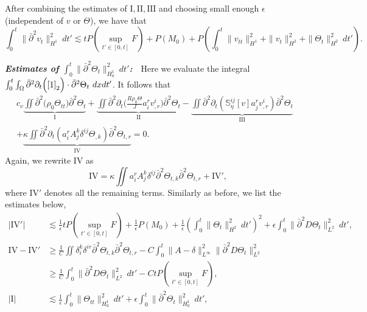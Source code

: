 \documentclass[12pt,a4paper]{amsart}
\numberwithin{equation}{section}
\theoremstyle{plain}
\theoremstyle{definition}
\newcommand{\bpartial}{\bar{\partial}}
\begin{document}
After combining the estimates of $\mathrm{I}, \mathrm{II}, \mathrm{III}$ and choosing small enough $\epsilon$ (independent of $v$ or $\Theta$), we have that
\begin{equation}\label{vtxx}
\int_{0}^{t}\|\bpartial^2 v_t\|_{H^1}^2\ dt'
\lesssim tP(\sup\limits_{t'\in[0,t]}F)+P(M_0)+P\left(  \int_{0}^{t}\|v_{tt}\|_{H^1}^2+\|v_t\|_{H^2}^2 +\|\Theta_{t}\|_{H^2}^2\ dt'\right).
\end{equation}

\vspace{0.3cm}
\textsl{\textbf{Estimates of $\int_{0}^{t}\|\bpartial^2 \Theta_{t}\|_{H_0^1}^2\ dt'$:}}~~Here we evaluate the integral 
$\int_{0}^{t}\int_{\Omega}\bpartial^2 \partial_t \Big(\eqref{1}_2\Big)\cdot  \bpartial^2 \Theta_t\ dx dt'$. It follows that
\begin{align*}
c_v\underbrace{\iint \bpartial ^2 \Big(\rho_0\Theta_{tt}\Big)\bpartial^2 \Theta_t}_{\mathrm{I}}
+\underbrace{\iint  \bpartial^2 \partial_t \Big(\frac{R\rho_0\Theta}{J} a^r_i v^i_{,r}\Big) \bpartial^2 \Theta_t}_{\mathrm{II}}
-\underbrace{\iint \bpartial^2 \partial_t (\mathbb{S}^{ij}_{\eta}[v] a^r_j v^i_{,r})  \bpartial^2 \Theta_t}_{\mathrm{III}}&\\
+\underbrace{\kappa\iint \bpartial^2 \partial_t(a^r_i A^k_j \delta^{ij}\Theta_{,k}) \bpartial^2 \Theta_{t,r}}_{\mathrm{IV}}=0.
\qquad\qquad\qquad\qquad&
\end{align*}
Again, we rewrite $\mathrm{IV}$ as 
$$
\mathrm{IV}=\kappa \iint a^r_i A^k_j \delta^{ij} \bpartial^2 \Theta_{t,k}
\bpartial^2 \Theta_{t,r}+\mathrm{IV}',
$$
where $\mathrm{IV}'$ denotes all the remaining terms.
Similarly as before, we list the estimates below,
\begin{align*}
|\mathrm{IV}'|
&\lesssim \frac{1}{\epsilon}tP(\sup\limits_{t'\in[0,t]}F)+\frac{1}{\epsilon}P(M_0)
  +\frac{1}{\epsilon}\left(  \int_{0}^{t}\|\Theta_t\|_{H^2}^2 \ dt'\right)^2
  +\epsilon\int_{0}^{t}\|\bpartial^2 D\Theta_{t}\|_{L^2}^2\ dt',\\
\mathrm{IV}-\mathrm{IV}'&\geq \frac{1}{C}\iint \delta_i^k \delta^{ir} \bpartial^2 \Theta_{t,k}\bpartial^2 \Theta_{t,r}
-C \int_{0}^{t}  \|A-\delta\|_{L^{\infty}}^2 \|\bpartial^2 D\Theta_{t}\|_{L^2}^2\\
&\geq \frac{1}{C} \int_{0}^{t} \|\bpartial^2 D\Theta_{t}\|_{L^2}^2 \ dt'-CtP(\sup\limits_{t'\in[0,t]}F),\\
|\mathrm{I}| &\lesssim  \frac{1}{\epsilon}\int_{0}^{t}  \|\Theta_{tt}\|_{H_0^1}^2 \ dt'
           +  \epsilon \int_{0}^{t}  \|\bpartial^2 \Theta_t\|_{H_0^1} ^2\ dt', 
\end{align*}
\end{document}

